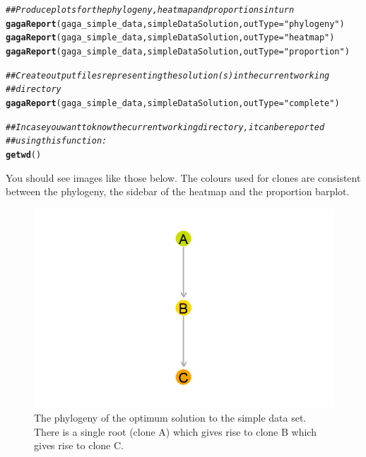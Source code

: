 \documentclass[a4paper]{article}\usepackage[]{graphicx}\usepackage[]{color}
\makeatletter
\newcommand{\hlstr}[1]{\textcolor[rgb]{0.192,0.494,0.8}{#1}}%
\newcommand{\hlcom}[1]{\textcolor[rgb]{0.678,0.584,0.686}{\textit{#1}}}%
\newcommand{\hlstd}[1]{\textcolor[rgb]{0.345,0.345,0.345}{#1}}%
\newcommand{\hlkwc}[1]{\textcolor[rgb]{0.333,0.667,0.333}{#1}}%
\newcommand{\hlkwd}[1]{\textcolor[rgb]{0.737,0.353,0.396}{\textbf{#1}}}%
\newenvironment{kframe}{%
 \def\at@end@of@kframe{}%
 \ifinner\ifhmode%
  \def\at@end@of@kframe{\end{minipage}}%
  \begin{minipage}{\columnwidth}%
 \fi\fi%
 \def\FrameCommand##1{\hskip\@totalleftmargin \hskip-\fboxsep
 \colorbox{shadecolor}{##1}\hskip-\fboxsep
     \hskip-\linewidth \hskip-\@totalleftmargin \hskip\columnwidth}%
 \MakeFramed {\advance\hsize-\width
   \@totalleftmargin\z@ \linewidth\hsize
   \@setminipage}}%
 {\par\unskip\endMakeFramed%
 \at@end@of@kframe}
\newenvironment{knitrout}{}{} %
\makeatother
\begin{document}
\begin{knitrout}
\color{fgcolor}\begin{kframe}
\begin{alltt}
\hlcom{## Produce plots for the phylogeny, heatmap and proportions in turn}
\hlkwd{gagaReport}\hlstd{(gaga_simple_data, simpleDataSolution,} \hlkwc{outType} \hlstd{=} \hlstr{"phylogeny"}\hlstd{)}
\hlkwd{gagaReport}\hlstd{(gaga_simple_data, simpleDataSolution,} \hlkwc{outType} \hlstd{=} \hlstr{"heatmap"}\hlstd{)}
\hlkwd{gagaReport}\hlstd{(gaga_simple_data, simpleDataSolution,} \hlkwc{outType} \hlstd{=} \hlstr{"proportion"}\hlstd{)}

\hlcom{## Create output files representing the solution(s) in the current working}
\hlcom{## directory}
\hlkwd{gagaReport}\hlstd{(gaga_simple_data, simpleDataSolution,} \hlkwc{outType} \hlstd{=} \hlstr{"complete"}\hlstd{)}

\hlcom{## In case you want to know the current working directory, it can be reported}
\hlcom{## using this function:}
\hlkwd{getwd}\hlstd{()}
\end{alltt}
\end{kframe}
\end{knitrout}


You should see images like those below.  The colours used for clones are consistent between the phylogeny, the sidebar of the heatmap and the proportion barplot.

\begin{figure}[H]
    \centering
    \includegraphics[width=\textwidth]{gaga_simple_data_phylogeny.png}
    \caption{The phylogeny of the optimum solution to the simple data set.  There is a single root (clone A) which gives rise to clone B which gives rise to clone C.}
\end{figure}
\end{document}
